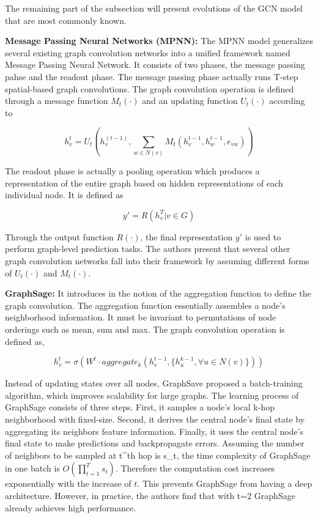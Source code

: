 The remaining part of the subsection will present evolutions of the GCN model that are most commonly known.

\textbf{Message Passing Neural Networks (MPNN):} The MPNN model generalizes several existing graph convolution networks into a unified framework named Message Passing Neural Network. It consists of two phases, the message passing pahse and the readout phase. The message passing phase actually runs T-step spatial-based graph convolutions. The graph convolution operation is defined through a message function $M_t(\cdot)$ and an updating function $U_t(\cdot)$ according to 

$$ h_v^t = U_t(h_v^{(t-1)}, \sum_{w \in N(v)} M_t(h_v^{t-1}, h_w^{t-1}, e_{vw}))$$

The readout phase is actually a pooling operation which produces a representation of the entire graph based on hidden representations of each individual node. It is defined as 

$$ y' = R(h_v^T|v \in G) $$

Through the output function $R(\cdot)$, the final representation $y'$ is used to perform graph-level prediction tasks. The authors \cite{mpnn} present that several other graph convolution networks fall into their framework by assuming different forms of $U_t(\cdot)$ and $M_t(·)$.


\textbf{GraphSage:} It introduces in \cite{graphsage} the notion of the aggregation function to define the graph convolution. The aggregation function essentially assembles a node's neighborhood information. It must be invariant to permutations of node orderings such as mean, sum and max. The graph convolution operation is defined as, 

$$ h_v^t = \sigma(W^t \cdot aggregate_k(h_v^{t-1}, \{h_u^{k-1}, \forall u \in N(v)\}))$$

Instead of updating states over all nodes, GraphSave proposed a batch-training algorithm, which improves scalability for large graphs. The learning process of GraphSage consists of three steps. First, it samples a node's local k-hop neighborhood with fixed-size. Second, it derives the central node's final state by aggregating its neighbors feature information. Finally, it uses the central node's final state to make predictions and backpropagate errors. Assuming the number of neighbors to be sampled at t^{th} hop is s_t, the time complexity of GraphSage in one batch is $O(\prod_{t=1}^{T}s_t)$. Therefore the computation cost increases exponentially with the increase of $t$. This prevents GraphSage from having a deep architecture. However, in practice, the authors find that with t=2 GraphSage already achieves high performance.

